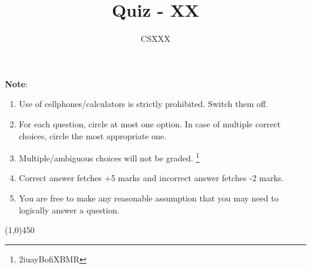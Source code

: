 \documentclass[10pt, letterpaper]{article}
\begin{document}
\title{Quiz - XX}
\author{CSXXX}
\date{}

\maketitle
\vspace{-0.25in}


\textbf{Note}:
\begin{enumerate}
\item Use of cellphones/calculators is strictly prohibited. Switch them off.  
\item For each question, circle at most one option. In case of multiple correct choices, circle the most appropriate one.
\item Multiple/ambiguous choices will not be graded. {\let\thefootnote\relax\footnote{2iuayBofiXBMR}}
\item Correct answer fetches +5 marks and incorrect answer fetches -2 marks.
\item You are free to make any reasonable assumption that you may need to logically answer a question.
\end{enumerate}
\vspace{-0.25in}
\begin{center}
\line(1,0){450}
\end{center}
\end{document}
